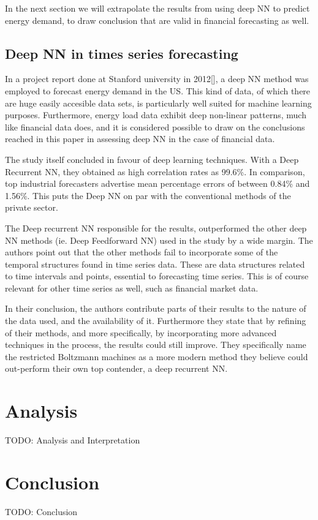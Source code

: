 In the next section we will extrapolate the results from using deep NN to predict energy demand, to draw conclusion that are valid in financial forecasting as well.

\subsection{Deep NN in times series forecasting}

In a project report done at Stanford university in 2012[], a deep NN method was employed to forecast energy demand in the US. This kind of data, of which there are huge easily accesible data sets, is particularly well suited for machine learning purposes. Furthermore, energy load data exhibit deep non-linear patterns, much like financial data does, and it is considered possible to draw on the conclusions reached in this paper in assessing deep NN in the case of financial data.

The study itself concluded in favour of deep learning techniques. With a Deep Recurrent NN, they obtained as high correlation rates as 99.6\%. In comparison, top industrial forecasters advertise mean percentage errors of between 0.84\% and 1.56\%. This puts the Deep NN on par with the conventional methods of the private sector.

The Deep recurrent NN responsible for the results, outperformed the other deep NN methods (ie. Deep Feedforward NN) used in the study by a wide margin. The authors point out that the other methods fail to incorporate some of the temporal structures found in time series data. These are data structures related to time intervals and points, essential to forecasting time series. This is of course relevant for other time series as well, such as financial market data.

In their conclusion, the authors contribute parts of their results to the nature of the data used, and the availability of it. Furthermore they state that by refining of their methods, and more specifically, by incorporating more advanced techniques in the process, the results could still improve. They specifically name the restricted Boltzmann machines as a more modern method they believe could out-perform their own top contender, a deep recurrent NN.




\newpage

\section{Analysis}
TODO: Analysis and Interpretation

\newpage

\section{Conclusion}
TODO: Conclusion
